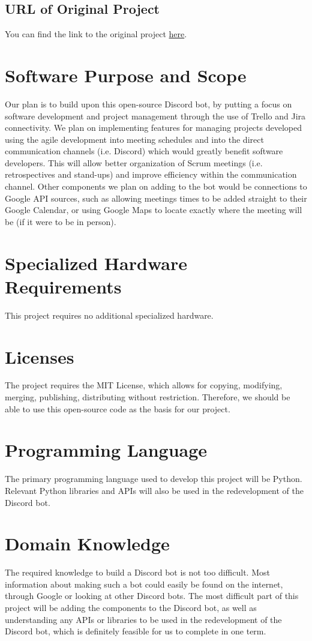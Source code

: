 \documentclass[12pt]{article}
\begin{document}
\subsection{URL of Original Project}
You can find the link to the original project \href{https://github.com/Code-Plus-Plus/discord-meeting-bot}{here}.

\section{Software Purpose and Scope}
Our plan is to build upon this open-source Discord bot, by putting a focus on software development and project management through the use of Trello and Jira connectivity. We plan on implementing features for managing projects developed using the agile development into meeting schedules and into the direct communication channels (i.e. Discord) which would greatly benefit software developers. This will allow better organization of Scrum meetings (i.e. retrospectives and stand-ups) and improve efficiency within the communication channel. Other components we plan on adding to the bot would be connections to Google API sources, such as allowing meetings times to be added straight to their Google Calendar, or using Google Maps to locate exactly where the meeting will be (if it were to be in person).

\section{Specialized Hardware Requirements}
This project requires no additional specialized hardware.

\section{Licenses}
The project requires the MIT License, which allows for copying, modifying, merging, publishing, distributing without restriction. Therefore, we should be able to use this open-source code as the basis for our project.

\section{Programming Language}
The primary programming language used to develop this project will be Python. Relevant Python libraries and APIs will also be used in the redevelopment of the Discord bot.

\section{Domain Knowledge}
The required knowledge to build a Discord bot is not too difficult. Most information about making such a bot could easily be found on the internet, through Google or looking at other Discord bots. The most difficult part of this project will be adding the components to the Discord bot, as well as understanding any APIs or libraries to be used in the redevelopment of the Discord bot, which is definitely feasible for us to complete in one term.
\end{document}
